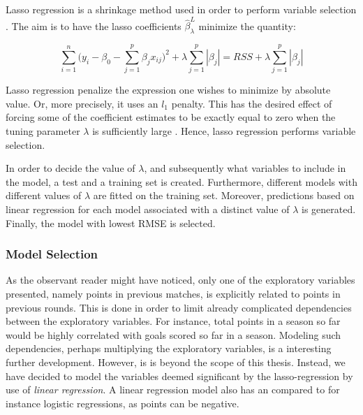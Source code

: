 Lasso regression is a shrinkage method used in order to perform variable selection \citep{ISLR}. The aim is to have the lasso coefficients $\hat{\beta}_{\lambda}^{L}$ minimize the quantity:

\begin{equation*}
    \sum_{i=1}^n\Big (y_i-\beta_0-\sum_{j=1}^p\beta_jx_{ij}\Big)^2 + \lambda \sum_{j=1}^p|\beta_j| = RSS + \lambda \sum_{j=1}^p|\beta_j|
\end{equation*}

Lasso regression penalize the expression one wishes to minimize by absolute value. Or, more precisely, it uses an $l_1$ penalty. This has the desired effect of forcing some of the coefficient estimates to be exactly equal to zero when the tuning parameter $\lambda$ is sufficiently large \citep{ISLR}. Hence, lasso regression performs variable selection.\newpar 

In order to decide the value of $\lambda$, and subsequently what variables to include in the model, a test and a training set is created. Furthermore, different models with different values of $\lambda$ are fitted on the training set. Moreover, predictions based on linear regression for each model associated with a distinct value of $\lambda$ is generated. Finally, the model with lowest RMSE is selected.

\subsubsection{Model Selection}

As the observant reader might have noticed, only one of the exploratory variables presented, namely points in previous matches, is explicitly related to points in previous rounds. This is done in order to limit already complicated dependencies between the exploratory variables. For instance, total points in a season so far would be highly correlated with goals scored so far in a season. Modeling such dependencies, perhaps multiplying the exploratory variables, is a interesting further development. However, is is beyond the scope of this thesis. Instead, we have decided to model the variables deemed significant by the lasso-regression by use of \textit{linear regression}. A linear regression model also has an compared to for instance logistic regressions, as points can be negative.

